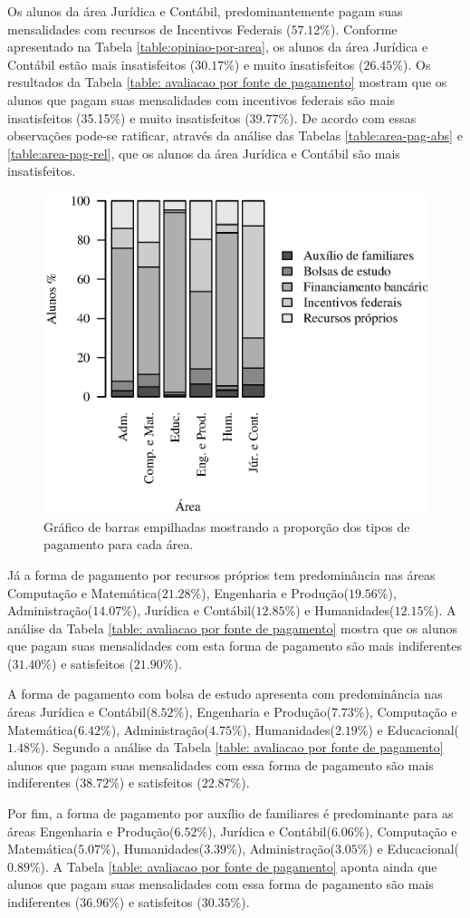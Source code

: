 \documentclass[10pt,a4paper,oneside]{article}
\newcommand{\adm}{Administração\xspace}
\newcommand{\comp}{Computação e Matemática\xspace}
\newcommand{\edu}{Educacional\xspace}
\newcommand{\eng}{Engenharia e Produção\xspace}
\newcommand{\hum}{Humanidades\xspace}
\newcommand{\jur}{Jurídica e Contábil\xspace}
\begin{document}
Os alunos da área \jur, predominantemente pagam suas mensalidades com recursos de Incentivos Federais ($57.12\%$). Conforme apresentado na Tabela \ref{table:opiniao-por-area}, os alunos da área 
\jur estão mais insatisfeitos ($30.17\%$) e muito insatisfeitos ($26.45\%$). Os resultados da Tabela \ref{table: avaliacao por fonte de pagamento} mostram que os alunos que pagam suas mensalidades com incentivos federais são 
mais insatisfeitos (35.15\%) e muito insatisfeitos ($39.77\%$). De acordo com essas observações pode-se ratificar, através da análise das Tabelas \ref{table:area-pag-abs} e \ref{table:area-pag-rel}, que 
os alunos da área \jur são mais insatisfeitos.

\begin{figure}[ht]
	\centering
	\includegraphics[width=0.70\linewidth]{plots/stacked100_pagamento_por_area.eps}
	\caption{Gráfico de barras empilhadas mostrando a proporção dos tipos de pagamento para cada área.}
	\label{fig:q20b}
\end{figure}

Já a forma de pagamento por recursos próprios tem predominância nas áreas \comp ($21.28\%$), \eng ($19.56\%$), \adm ($14.07\%$), \jur($12.85\%$) e \hum ($12.15\%$). A análise da Tabela \ref{table: avaliacao por fonte de pagamento} mostra que os alunos que pagam suas mensalidades com esta forma de pagamento são mais indiferentes ($31.40\%$) e satisfeitos ($21.90\%$). 

A forma de pagamento com bolsa de estudo apresenta com predominância nas áreas \jur ($8.52\%$), \eng ($7.73\%$), \comp ($6.42\%$), \adm ($4.75\%$), \hum ($2.19\%$) e \edu($1.48\%$). Segundo a análise da Tabela \ref{table: avaliacao por fonte de pagamento} alunos que pagam suas mensalidades com essa forma de pagamento 
são mais indiferentes ($38.72\%$) e satisfeitos ($22.87\%$).

Por fim, a forma de pagamento por auxílio de familiares é predominante para as áreas \eng($6.52\%$), \jur ($6.06\%$), \comp ($5.07\%$), \hum($3.39\%$), \adm ($3.05\%$) e \edu ($0.89\%$). A Tabela \ref{table: avaliacao por fonte de pagamento} aponta ainda que alunos que pagam suas mensalidades com essa forma de pagamento são mais indiferentes ($36.96\%$) e satisfeitos ($30.35\%$).
\end{document}
